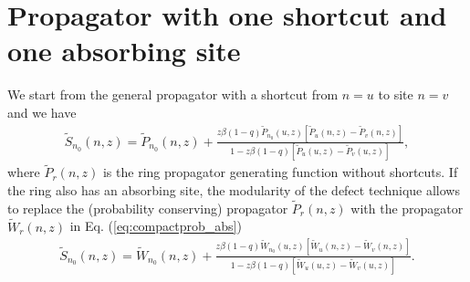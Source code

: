 \documentclass[idelinks, superscriptaddress, amsmath, amssymb, aps, pre]{revtex4-2}
\begin{document}



\section*{Propagator with one shortcut and one absorbing site}

We start from the general propagator with a shortcut from $n=u$ to site $n=v$ and we have
\begin{align}
\widetilde{S}_{n_0}(n,z)=\widetilde{P}_{n_0}(n,z)+\frac{z\beta (1-q)\widetilde{P}_{n_0}(u,z)\left[\widetilde{P}_{u}(n,z)-\widetilde{P}_{v}(n,z)\right]}{1-z\beta(1-q)\left[\widetilde{P}_{u}(u,z)-\widetilde{P}_{v}(u,z)\right]},
\label{eq:one_def_prop}
\end{align}
where $\widetilde{P}_{r}(n,z)$ is the ring propagator generating function without shortcuts. If the ring also has an absorbing site, the modularity of the defect technique allows to replace the (probability conserving) propagator $\widetilde{P}_{r}(n,z)$ with the propagator $\widetilde{W}_{r}(n,z)$ in Eq. (\ref{eq:compactprob_abs})
\begin{align}
\widetilde{S}_{n_0}(n,z)=\widetilde{W}_{n_0}(n,z)+\frac{z\beta (1-q)\widetilde{W}_{n_0}(u,z)\left[\widetilde{W}_{u}(n,z)-\widetilde{W}_{v}(n,z)\right]}{1-z\beta(1-q)\left[\widetilde{W}_{u}(u,z)-\widetilde{W}_{v}(u,z)\right]}.
\label{eq:one_def_prop_abs}
\end{align}
\end{document}

